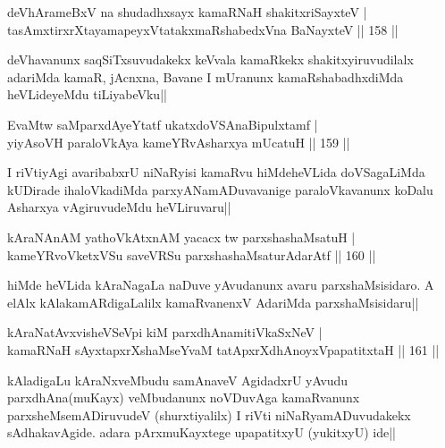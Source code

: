 \begin{shl}
deVhArameBxV na shudadhxsayx kamaRNaH shakitxriSayxteV |\\
tasAmxtirxrXtayamapeyxVtatakxmaRshabedxVna BaNayxteV \hfill || 158 ||
\end{shl}

\begin{artha}
deVhavanunx saqSiTxsuvudakekx keVvala kamaRkekx shakitxyiruvudilalx adariMda kamaR, jAcnxna, Bavane I mUranunx kamaRshabadhxdiMda heVLideyeMdu tiLiyabeVku||
\end{artha}

\begin{shl}
EvaMtw saMparxdAyeYtatf ukatxdoVSAnaBipulxtamf  | \\
 yiyAsoVH paraloVkAya kameYRvAsharxya mUcatuH \hfill|| 159 ||
\end{shl}

\begin{artha}
I riVtiyAgi avaribabxrU niNaRyisi kamaRvu hiMdeheVLida doVSagaLiMda kUDirade 
ihaloVkadiMda parxyANamADuvavanige paraloVkavanunx koDalu Asharxya vAgiruvudeMdu 
heVLiruvaru||
\end{artha}

\begin{shl}
kAraNAnAM yathoVkAtxnAM yacacx tw parxshashaMsatuH |\\
kameYRvoVketxVSu saveVRSu parxshashaMsaturAdarAtf \hfill || 160 ||
\end{shl}

\begin{artha}
hiMde heVLida kAraNagaLa naDuve yAvudanunx avaru parxshaMsisidaro. A elAlx kAlakamARdigaLalilx kamaRvanenxV AdariMda parxshaMsisidaru||
\end{artha}

\begin{shl}
kAraNatAvxvisheVSeV\s pi kiM parxdhAnamitiVkaSxNeV |\\
kamaRNaH sAyxtapxrXshaMseYvaM tatApxrXdhAnoyxVpapatitxtaH \hfill || 161 ||
\end{shl}

\begin{artha}
kAladigaLu kAraNxveMbudu samAnaveV AgidadxrU yAvudu parxdhAna(muKayx) veMbudanunx noVDuvAga kamaRvanunx parxsheMsemADiruvudeV (shurxtiyalilx) I riVti niNaRyamADuvudakekx sAdhakavAgide. adara pArxmuKayxtege upapatitxyU (yukitxyU) ide||
\end{artha}


